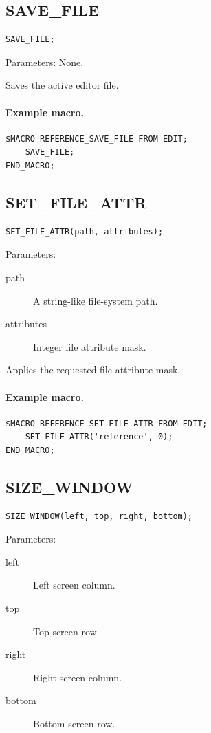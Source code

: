 \documentclass[a4paper,10pt,twoside,openany]{book}
\begin{document}
\label{prim:procedure-save-file}
\subsection*{SAVE\_FILE}
\begin{verbatim}
SAVE_FILE;
\end{verbatim}
Parameters: None.

Saves the active editor file.

\paragraph{Example macro.}
\begin{verbatim}
$MACRO REFERENCE_SAVE_FILE FROM EDIT;
    SAVE_FILE;
END_MACRO;
\end{verbatim}

\label{prim:procedure-set-file-attr}
\subsection*{SET\_FILE\_ATTR}
\begin{verbatim}
SET_FILE_ATTR(path, attributes);
\end{verbatim}
Parameters:
\begin{description}
\item[path] A string-like file-system path.
\item[attributes] Integer file attribute mask.
\end{description}

Applies the requested file attribute mask.

\paragraph{Example macro.}
\begin{verbatim}
$MACRO REFERENCE_SET_FILE_ATTR FROM EDIT;
    SET_FILE_ATTR('reference', 0);
END_MACRO;
\end{verbatim}

\label{prim:procedure-size-window}
\subsection*{SIZE\_WINDOW}
\begin{verbatim}
SIZE_WINDOW(left, top, right, bottom);
\end{verbatim}
Parameters:
\begin{description}
\item[left] Left screen column.
\item[top] Top screen row.
\item[right] Right screen column.
\item[bottom] Bottom screen row.
\end{description}
\end{document}
